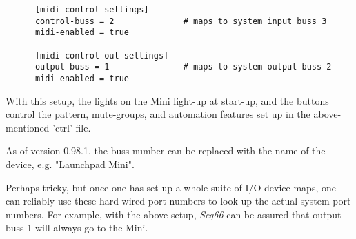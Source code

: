    \begin{verbatim}
      [midi-control-settings]
      control-buss = 2              # maps to system input buss 3
      midi-enabled = true

      [midi-control-out-settings]
      output-buss = 1               # maps to system output buss 2
      midi-enabled = true
   \end{verbatim}

   With this setup, the lights on the Mini light-up at start-up, and the
   buttons control the pattern, mute-groups, and automation features set up in
   the above-mentioned 'ctrl' file.
   
   As of version 0.98.1, the buss number can be replaced with the name of the
   device, e.g. "Launchpad Mini".

   Perhaps tricky, but once one has set up a whole suite of I/O device maps,
   one can reliably use these hard-wired port numbers to look up the actual
   system port numbers.  For example, with the above setup, \textsl{Seq66} can
   be assured that output buss 1 will always go to the Mini.

